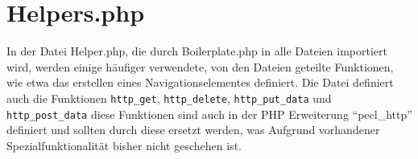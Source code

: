 \section{Helpers.php}
\label{sub:Helpers.php}

In der Datei Helper.php, die durch Boilerplate.php in alle Dateien importiert
wird, werden einige häufiger verwendete, von den Dateien geteilte Funktionen,
wie etwa das erstellen eines Navigationselementes definiert. Die Datei definiert
auch die Funktionen \texttt{http\_get}, \texttt{http\_delete},
\texttt{http\_put\_data} und \texttt{http\_post\_data} diese Funktionen sind
auch in der PHP Erweiterung ``pecl\_http'' definiert und sollten durch diese
ersetzt werden, was Aufgrund vorhandener Spezialfunktionalität bisher nicht
geschehen ist.
